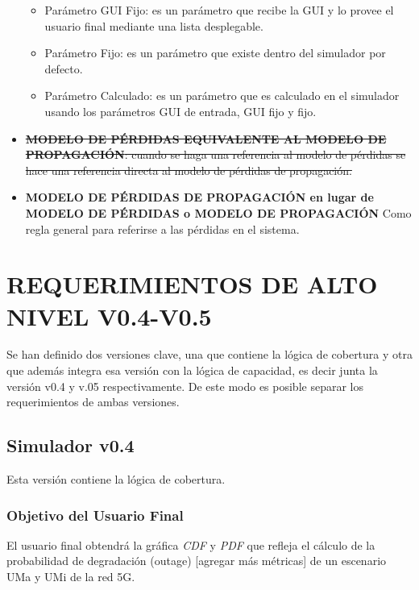 \begin{itemize}
\begin{itemize}
        \item Parámetro GUI Fijo: es un parámetro que recibe la GUI y lo provee el usuario final mediante una lista desplegable.
        
        \item Parámetro Fijo: es un parámetro que existe dentro del simulador por defecto.
        
        \item Parámetro Calculado:
        es un parámetro que es calculado en el simulador usando los parámetros GUI de entrada, GUI fijo y fijo.
    \end{itemize}
    \item \sout{\textbf{MODELO DE PÉRDIDAS EQUIVALENTE AL MODELO DE PROPAGACIÓN}: cuando se haga una referencia al modelo de pérdidas se hace una referencia directa al modelo de pérdidas de propagación.}
    \item \textbf{MODELO DE PÉRDIDAS DE PROPAGACIÓN en lugar de MODELO DE PÉRDIDAS o MODELO DE PROPAGACIÓN} Como regla general para referirse a las pérdidas en el sistema.
\end{itemize}

\section{REQUERIMIENTOS DE ALTO NIVEL V0.4-V0.5}
Se han definido dos versiones clave, una que contiene la lógica de cobertura y otra que además integra esa versión con la lógica de capacidad, es decir junta la versión v0.4 y v.05 respectivamente. De este modo es posible separar los requerimientos de ambas versiones.


\subsection{Simulador v0.4}
Esta versión contiene la lógica de cobertura.
\subsubsection{Objetivo del Usuario Final}
El usuario final obtendrá  la gráfica \textit{CDF} y \textit{PDF} que refleja el cálculo de la probabilidad de degradación (outage) [agregar más métricas] de un escenario UMa y UMi de la red 5G.

